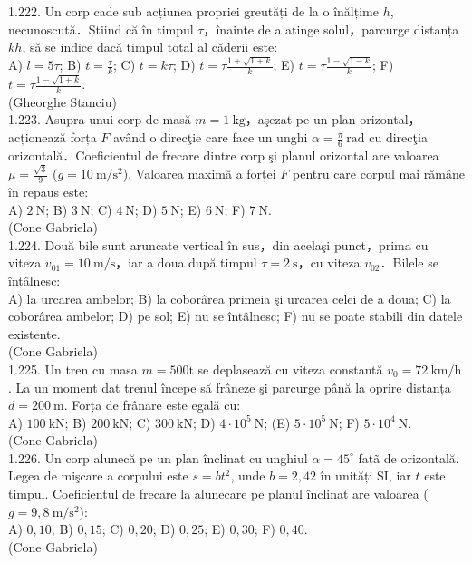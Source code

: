 {1.222. Un corp cade sub acțiunea propriei greutăți de la o înălțime $h$, necunoscută．Știind că în timpul $\tau$，înainte de a atinge solul，parcurge distanța $k h$, să se indice dacă timpul total al căderii este:\\ A) $l=5 \tau$; B) $t=\frac{\tau}{k}$; C) $t=k \tau$; D) $t=\tau \frac{1+\sqrt{1+k}}{k}$; E) $t=\tau \frac{1-\sqrt{1-k}}{k}$; F) $t=\tau \frac{1-\sqrt{1+k}}{k}$.\\ (Gheorghe Stanciu)\\

1.223. Asupra unui corp de masă $m=1 \mathrm{~kg}$，aşezat pe un plan orizontal，acționează forța $F$ având o direcţie care face un unghi $\alpha=\frac{\pi}{6} \mathrm{~rad}$ cu direcţia orizontală．Coeficientul de frecare dintre corp şi planul orizontal are valoarea $\mu=\frac{\sqrt{3}}{9}$ ($g=10 \mathrm{~m} / \mathrm{s}^{2}$). Valoarea maximă a forței $F$ pentru care corpul mai rămâne în repaus este:\\ A) $2 \mathrm{~N}$; B) $3 \mathrm{~N}$; C) $4 \mathrm{~N}$; D) $5 \mathrm{~N}$; E) $6 \mathrm{~N}$; F) $7 \mathrm{~N}$.\\ (Cone Gabriela)\\

1.224. Două bile sunt aruncate vertical în sus，din acelaşi punct，prima cu viteza $v_{01}=10 \mathrm{~m} / \mathrm{s}$，iar a doua după timpul $\tau=2 \mathrm{~s}$，cu viteza $v_{02}$．Bilele se întâlnesc:\\ A) la urcarea ambelor; B) la coborârea primeia şi urcarea celei de a doua; C) la coborârea ambelor; D) pe sol; E) nu se întâlnesc; F) nu se poate stabili din datele existente.\\ (Cone Gabriela)\\

1.225. Un tren cu masa $m=500 \mathrm{t}$ se deplasează cu viteza constantă $v_{0}=72 \mathrm{~km} / \mathrm{h}$. La un moment dat trenul începe să frâneze şi parcurge până la oprire distanța $d=200 \mathrm{~m}$. Forța de frânare este egală cu:\\ A) $100 \mathrm{~kN}$; B) $200 \mathrm{~kN}$; C) $300 \mathrm{~kN}$; D) $4 \cdot 10^{5} \mathrm{~N}$; (E) $5 \cdot 10^{5} \mathrm{~N}$; F) $5 \cdot 10^{4} \mathrm{~N}$.\\ (Cone Gabriela)\\

1.226. Un corp alunecă pe un plan înclinat cu unghiul $\alpha=45^{\circ}$ fațã de orizontală. Legea de mişcare a corpului este $s=b t^{2}$, unde $b=2,42$ în unități SI, iar $t$ este timpul. Coeficientul de frecare la alunecare pe planul înclinat are valoarea ($g=9,8 \mathrm{~m} / \mathrm{s}^{2}$):\\ A) $0,10$; B) $0,15$; C) $0,20$; D) $0,25$; E) $0,30$; F) $0,40$.\\ (Cone Gabriela)\\

}
